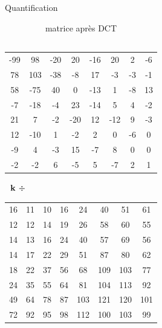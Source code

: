 \documentclass[xcolor=dvipsnames]{beamer}
\begin{document}
\begin{frame}{Quantification}
\begin{minipage}{0.29\textwidth}
\begin{table}
            \begin{tabular}{cccccccc}
                -99 & 98 & -20 & 20 & -16 & 20 & 2 & -6\\
                78 & 103 & -38 & -8 & 17 & -3 & -3 & -1\\
                58 & -75 & 40 & 0 & -13 & 1 & -8 & 13\\
                -7 & -18 & -4 & 23 & -14 & 5 & 4 & -2\\
                21 & 7 & -2 & -20 & 12 & -12 & 9 & -3\\
                12 & -10 & 1 & -2 & 2 & 0 & -6 & 0\\
                -9 & 4 & -3 & 15 & -7 & 8 & 0 & 0\\
                -2 & -2 & 6 & -5 & 5 & -7 & 2 & 1\\
            \end{tabular}
            \caption*{\centering \tiny  matrice après DCT \\ \ }
        \end{table}
    \end{minipage}
    \hfill
    \begin{minipage}{0.09\textwidth}
        \centering
        \Large
        \vspace{-40pt}
        $ \textbf{ \textbf{\tiny \ }k $\div$} $
    \end{minipage}
    \hfill
    \begin{minipage}{0.3\textwidth}
        \centering
        \begin{table}
            \tiny 
            \centering
            \setlength{\tabcolsep}{2pt} %
            \renewcommand{\arraystretch}{1.2} %
            \begin{tabular}{cccccccc}
                16 & 11 & 10 & 16 & 24 & 40 & 51 & 61\\
                12 & 12 & 14 & 19 & 26 & 58 & 60 & 55\\
                14 & 13 & 16 & 24 & 40 & 57 & 69 & 56\\
                14 & 17 & 22 & 29 & 51 & 87 & 80 & 62\\
                18 & 22 & 37 & 56 & 68 & 109 & 103 & 77\\
                24 & 35 & 55 & 64 & 81 & 104 & 113 & 92\\
                49 & 64 & 78 & 87 & 103 & 121 & 120 & 101\\
                72 & 92 & 95 & 98 & 112 & 100 & 103 & 99\\

\end{tabular}
\end{table}
\end{minipage}
\end{frame}
\end{document}
